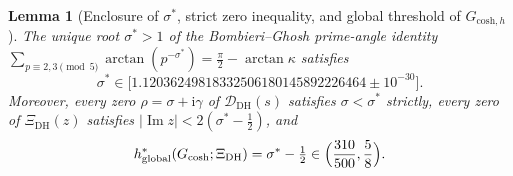 \documentclass[11pt,a4paper,reqno]{amsart}
\newtheorem{lemma}[theorem]{Lemma}
\theoremstyle{definition}
\theoremstyle{remark}
\numberwithin{equation}{section}
\newcommand{\ii}{\mathrm{i}}
\DeclareMathOperator{\Imop}{Im}
\begin{document}
\begin{lemma}[Enclosure of $\sigma^*$, strict zero inequality, and global threshold of $G_{\mathrm{cosh},h}$]
\label{lem:bohr-enclosure}
The unique root $\sigma^* > 1$ of the Bombieri--Ghosh prime-angle identity $\sum_{p \equiv 2,3 \pmod{5}}\arctan(p^{-\sigma^*}) = \frac{\pi}{2} - \arctan\kappa$ satisfies
\begin{equation}
  \sigma^* \in \bigl[1.12036249818332506180145892226464 \pm 10^{-30}\bigr].
  \label{eq:sigma-star-enclosure}
\end{equation}
Moreover, every zero $\rho = \sigma + \ii\gamma$ of $\mathcal{D}_{\mathrm{DH}}(s)$ satisfies $\sigma < \sigma^*$ strictly, every zero of $\Xi_{\mathrm{DH}}(z)$ satisfies $|\Imop z| < 2(\sigma^* - \frac{1}{2})$, and
\begin{equation}
  h_{\mathrm{global}}^*\!\left(G_{\mathrm{cosh}}; \Xi_{\mathrm{DH}}\right)
  = \sigma^* - \tfrac{1}{2} \in \Bigl(\frac{310}{500}, \frac{5}{8}\Bigr).
  \label{eq:cosh-global-threshold}
\end{equation}
\end{lemma}
\end{document}
